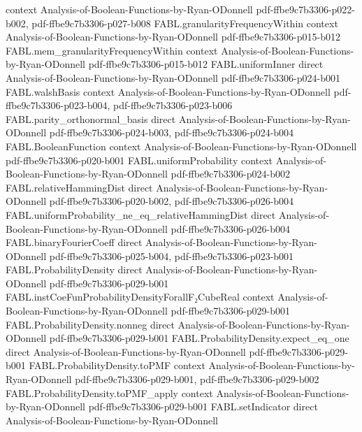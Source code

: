 \begin{theorem}
  {context}
  {Analysis-of-Boolean-Functions-by-Ryan-ODonnell}
  {pdf-ffbe9c7b3306-p022-b002,
    pdf-ffbe9c7b3306-p027-b008}
\proofstep
  {FABL.granularityFrequencyWithin}
  {context}
  {Analysis-of-Boolean-Functions-by-Ryan-ODonnell}
  {pdf-ffbe9c7b3306-p015-b012}
\proofstep
  {FABL.mem_granularityFrequencyWithin}
  {context}
  {Analysis-of-Boolean-Functions-by-Ryan-ODonnell}
  {pdf-ffbe9c7b3306-p015-b012}
\proofstep
  {FABL.uniformInner}
  {direct}
  {Analysis-of-Boolean-Functions-by-Ryan-ODonnell}
  {pdf-ffbe9c7b3306-p024-b001}
\proofstep
  {FABL.walshBasis}
  {context}
  {Analysis-of-Boolean-Functions-by-Ryan-ODonnell}
  {pdf-ffbe9c7b3306-p023-b004,
    pdf-ffbe9c7b3306-p023-b006}
\proofstep
  {FABL.parity_orthonormal_basis}
  {direct}
  {Analysis-of-Boolean-Functions-by-Ryan-ODonnell}
  {pdf-ffbe9c7b3306-p024-b003,
    pdf-ffbe9c7b3306-p024-b004}
\proofstep
  {FABL.BooleanFunction}
  {context}
  {Analysis-of-Boolean-Functions-by-Ryan-ODonnell}
  {pdf-ffbe9c7b3306-p020-b001}
\proofstep
  {FABL.uniformProbability}
  {context}
  {Analysis-of-Boolean-Functions-by-Ryan-ODonnell}
  {pdf-ffbe9c7b3306-p024-b002}
\proofstep
  {FABL.relativeHammingDist}
  {direct}
  {Analysis-of-Boolean-Functions-by-Ryan-ODonnell}
  {pdf-ffbe9c7b3306-p020-b002,
    pdf-ffbe9c7b3306-p026-b004}
\proofstep
  {FABL.uniformProbability_ne_eq_relativeHammingDist}
  {direct}
  {Analysis-of-Boolean-Functions-by-Ryan-ODonnell}
  {pdf-ffbe9c7b3306-p026-b004}
\proofstep
  {FABL.binaryFourierCoeff}
  {direct}
  {Analysis-of-Boolean-Functions-by-Ryan-ODonnell}
  {pdf-ffbe9c7b3306-p025-b004,
    pdf-ffbe9c7b3306-p023-b001}
\proofstep
  {FABL.ProbabilityDensity}
  {direct}
  {Analysis-of-Boolean-Functions-by-Ryan-ODonnell}
  {pdf-ffbe9c7b3306-p029-b001}
\proofstep
  {FABL.instCoeFunProbabilityDensityForallF₂CubeReal}
  {context}
  {Analysis-of-Boolean-Functions-by-Ryan-ODonnell}
  {pdf-ffbe9c7b3306-p029-b001}
\proofstep
  {FABL.ProbabilityDensity.nonneg}
  {direct}
  {Analysis-of-Boolean-Functions-by-Ryan-ODonnell}
  {pdf-ffbe9c7b3306-p029-b001}
\proofstep
  {FABL.ProbabilityDensity.expect_eq_one}
  {direct}
  {Analysis-of-Boolean-Functions-by-Ryan-ODonnell}
  {pdf-ffbe9c7b3306-p029-b001}
\proofstep
  {FABL.ProbabilityDensity.toPMF}
  {context}
  {Analysis-of-Boolean-Functions-by-Ryan-ODonnell}
  {pdf-ffbe9c7b3306-p029-b001,
    pdf-ffbe9c7b3306-p029-b002}
\proofstep
  {FABL.ProbabilityDensity.toPMF_apply}
  {context}
  {Analysis-of-Boolean-Functions-by-Ryan-ODonnell}
  {pdf-ffbe9c7b3306-p029-b001}
\proofstep
  {FABL.setIndicator}
  {direct}
  {Analysis-of-Boolean-Functions-by-Ryan-ODonnell}

\end{theorem}
